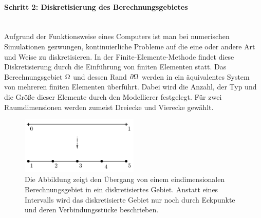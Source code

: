 \documentclass[crop=false]{standalone}
\begin{document}
      \paragraph{Schritt 2: Diskretisierung des Berechnungsgebietes} %
      \label{par:schritt_2_diskretisierung_des_berechnungsgebietes}
        \hfill\\
        Aufgrund der Funktionsweise eines Computers ist man bei numerischen Simulationen gezwungen, kontinuierliche Probleme auf die eine oder andere Art und Weise zu diskretisieren.
        In der Finite-Elemente-Methode findet diese Diskretisierung durch die Einführung von finiten Elementen statt.
        Das Berechnungsgebiet $\Omega$ und dessen Rand $\partial\Omega$ werden in ein äquivalentes System von mehreren finiten Elementen überführt.
        Dabei wird die Anzahl, der Typ und die Größe dieser Elemente durch den Modellierer festgelegt.
        Für zwei Raumdimensionen werden zumeist Dreiecke und Vierecke gewählt.
        \begin{figure}[h]
          \center
          \includegraphics[width=0.5\textwidth]{images/domain_one_dimension_example.pdf}
          \caption[Diskretisierung eines eindimensionalen Berechnungsgebietes]{%
            Die Abbildung zeigt den Übergang von einem eindimensionalen Berechnungsgebiet in ein diskretisiertes Gebiet.
            Anstatt eines Intervalls wird das diskretisierte Gebiet nur noch durch Eckpunkte und deren Verbindungsstücke beschrieben.
          }
          \label{fig:domain-example}
        \end{figure}
\end{document}
